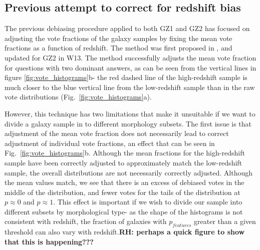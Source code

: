 \documentclass[useAMS,usenatbib]{mn2e}
\newcommand{\rh}[1]{{\bf \textcolor{RoyalPurple}{RH: #1}}}
\begin{document}
\subsection{Previous attempt to correct for redshift bias}
\label{sec:previous_method}

The previous debiasing procedure applied to both GZ1 and GZ2 has focused on adjusting the vote fractions of the galaxy samples by fixing the mean vote fractions as a function of redshift. The method was first proposed in \cite{Bamford_09}, and updated for GZ2 in W13. The method successfully adjusts the mean vote fraction for questions with two dominant answers, as can be seen from the vertical lines in figure \ref{fig:vote_histograms}b- the red dashed line of the high-redshift sample is much closer to the blue vertical line from the low-redshift sample than in the raw vote distributions (Fig.~\ref{fig:vote_histograms}a).

However, this technique has two limitations that make it unsuitable if we want to divide a galaxy sample in to different morphology subsets.  The first issue is that adjustment of the mean vote fraction does not necessarily lead to correct adjustment of individual vote fractions, an effect that can be seen in Fig.~\ref{fig:vote_histograms}b.  Although the mean fractions for the high-redshift sample have been correctly adjusted to approximately match the low-redshift sample, the overall distributions are not necessarily correctly adjusted. Although the mean values match, we see that there is an excess of debiased votes in the middle of the distribution, and fewer votes for the tails of the distribution at $p \approx 0$ and $p \approx 1$. This effect is important if we wish to divide our sample into different subsets by morphological type- as the shape of the histograms is not consistent with redshift, the fraction of galaxies with $p_{features}$ greater than a given threshold can also vary with redshift.\rh{perhaps a quick figure to show that this is happening???}
\end{document}
